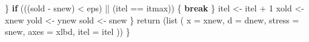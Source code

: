 \documentclass[
  12pt,
  letterpaper,
  DIV=11,
  numbers=noendperiod]{scrreprt}
\newenvironment{Shaded}{\begin{snugshade}}{\end{snugshade}}
\newcommand{\AttributeTok}[1]{\textcolor[rgb]{0.40,0.45,0.13}{#1}}
\newcommand{\ControlFlowTok}[1]{\textcolor[rgb]{0.00,0.23,0.31}{\textbf{#1}}}
\newcommand{\DecValTok}[1]{\textcolor[rgb]{0.68,0.00,0.00}{#1}}
\newcommand{\FunctionTok}[1]{\textcolor[rgb]{0.28,0.35,0.67}{#1}}
\newcommand{\NormalTok}[1]{\textcolor[rgb]{0.00,0.23,0.31}{#1}}
\newcommand{\OtherTok}[1]{\textcolor[rgb]{0.00,0.23,0.31}{#1}}
\newcommand{\SpecialCharTok}[1]{\textcolor[rgb]{0.37,0.37,0.37}{#1}}
\theoremstyle{remark}
\begin{document}
\begin{Shaded}
\begin{Highlighting}[]
\NormalTok{      \}}
      \ControlFlowTok{if}\NormalTok{ (((sold }\SpecialCharTok{{-}}\NormalTok{ snew) }\SpecialCharTok{\textless{}}\NormalTok{ eps) }\SpecialCharTok{||}\NormalTok{ (itel }\SpecialCharTok{==}\NormalTok{ itmax)) \{}
        \ControlFlowTok{break}
\NormalTok{      \}}
\NormalTok{      itel }\OtherTok{\textless{}{-}}\NormalTok{ itel }\SpecialCharTok{+} \DecValTok{1}
\NormalTok{      xold }\OtherTok{\textless{}{-}}\NormalTok{ xnew}
\NormalTok{      yold }\OtherTok{\textless{}{-}}\NormalTok{ ynew}
\NormalTok{      sold }\OtherTok{\textless{}{-}}\NormalTok{ snew}
\NormalTok{    \}}
    \FunctionTok{return}\NormalTok{ (}\FunctionTok{list}\NormalTok{ (}
      \AttributeTok{x =}\NormalTok{ xnew,}
      \AttributeTok{d =}\NormalTok{ dnew,}
      \AttributeTok{stress =}\NormalTok{ snew,}
      \AttributeTok{axes =}\NormalTok{ xlbd,}
      \AttributeTok{itel =}\NormalTok{ itel}
\NormalTok{    ))}
\NormalTok{  \}}


\end{Highlighting}
\end{Shaded}
\end{document}
